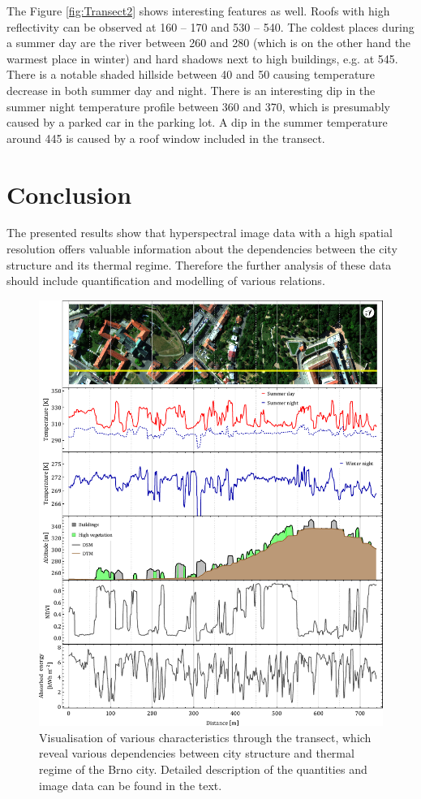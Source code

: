 The Figure \ref{fig:Transect2} shows interesting features as well. Roofs with high reflectivity can be observed at 160 – 170 and 530 – 540. The coldest places during a summer day are the river between 260 and 280 (which is on the other hand the warmest place in winter) and hard shadows next to high buildings, e.g. at 545. There is a notable shaded hillside between 40 and 50 causing temperature decrease in both summer day and night. There is an interesting dip in the summer night temperature profile between 360 and 370, which is presumably caused by a parked car in the parking lot. A dip in the summer temperature around 445 is caused by a roof window included in the transect.

\section{Conclusion}

The presented results show that hyperspectral image data with a high spatial resolution offers valuable information about the dependencies between the city structure and its thermal regime. Therefore the further analysis of these data should include quantification and modelling of various relations. 

\newpage
\begin{figure}[!t]
\centering
\includegraphics[width=\linewidth]{pics/Appendix_B/Transect_1.pdf}
\vspace{1.5 em}
\caption{Visualisation of various characteristics through the transect, which reveal various dependencies between city structure and thermal regime of the Brno city. Detailed description of the quantities and image data can be found in the text.}
\label{fig:Transect1}
\end{figure}

